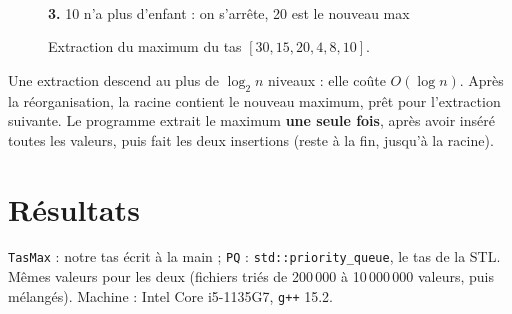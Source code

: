 \documentclass[11pt,a4paper]{article}
\begin{document}
\begin{figure}[H]
\begin{minipage}[t]{0.32\textwidth}
\end{minipage}
\hfill
\begin{minipage}[t]{0.32\textwidth}\centering
{}\\[2pt]
\small \textbf{3.} 10 n'a plus d'enfant : on s'arrête, 20 est le nouveau max
\end{minipage}
\caption{Extraction du maximum du tas $[30, 15, 20, 4, 8, 10]$.}
\end{figure}

Une extraction descend au plus de $\log_2 n$ niveaux : elle coûte $O(\log n)$. Après la
réorganisation, la racine contient le nouveau maximum, prêt pour l'extraction suivante. Le
programme extrait le maximum \textbf{une seule fois}, après avoir inséré toutes les valeurs,
puis fait les deux insertions (reste à la fin, jusqu'à la racine).

\section{Résultats}

\texttt{TasMax} : notre tas écrit à la main ; \texttt{PQ} : \texttt{std::priority\_queue}, le
tas de la STL. Mêmes valeurs pour les deux (fichiers triés de 200\,000 à 10\,000\,000 valeurs,
puis mélangés). Machine : Intel Core i5-1135G7, \texttt{g++} 15.2.
\end{document}
